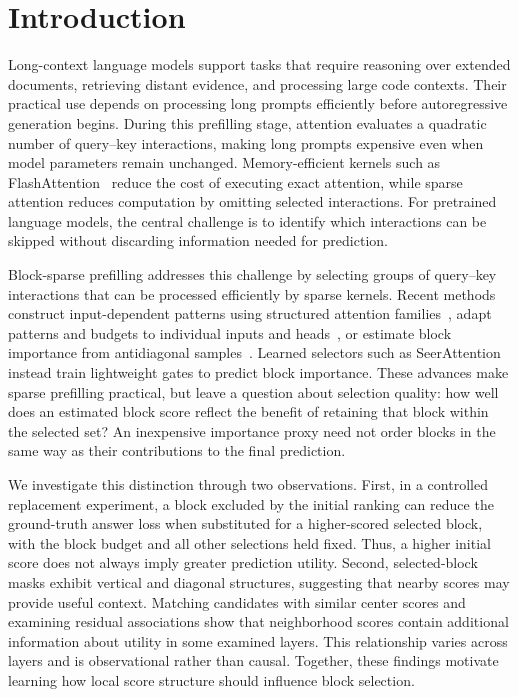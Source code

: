 \section{Introduction}
\label{sec:introduction}

Long-context language models support tasks that require reasoning over
extended documents, retrieving distant evidence, and processing large code
contexts. Their practical use depends on processing long prompts efficiently
before autoregressive generation begins. During this prefilling stage,
attention evaluates a quadratic number of query--key interactions, making
long prompts expensive even when model parameters remain unchanged.
Memory-efficient kernels such as FlashAttention~\citep{dao2022flashattention}
reduce the cost of executing exact attention, while sparse attention reduces
computation by omitting selected interactions. For pretrained language models,
the central challenge is to identify which interactions can be skipped without
discarding information needed for prediction.

Block-sparse prefilling addresses this challenge by selecting groups of
query--key interactions that can be processed efficiently by sparse kernels.
Recent methods construct input-dependent patterns using structured attention
families~\citep{jiang2024minference}, adapt patterns and budgets to individual
inputs and heads~\citep{lai2025flexprefill}, or estimate block importance from
antidiagonal samples~\citep{xu2025xattention}. Learned selectors such as
SeerAttention~\citep{gao2025seerattention} instead train lightweight gates to
predict block importance. These advances make sparse prefilling practical,
but leave a question about selection quality: how well does an estimated
block score reflect the benefit of retaining that block within the selected
set? An inexpensive importance proxy need not order blocks in the same way
as their contributions to the final prediction.

We investigate this distinction through two observations. First, in a
controlled replacement experiment, a block excluded by the initial ranking
can reduce the ground-truth answer loss when substituted for a higher-scored
selected block, with the block budget and all other selections held fixed.
Thus, a higher initial score does not always imply greater prediction
utility. Second, selected-block masks exhibit vertical and diagonal
structures, suggesting that nearby scores may provide useful context.
Matching candidates with similar center scores and examining residual
associations show that neighborhood scores contain additional information
about utility in some examined layers. This relationship varies across
layers and is observational rather than causal. Together, these findings
motivate learning how local score structure should influence block selection.


